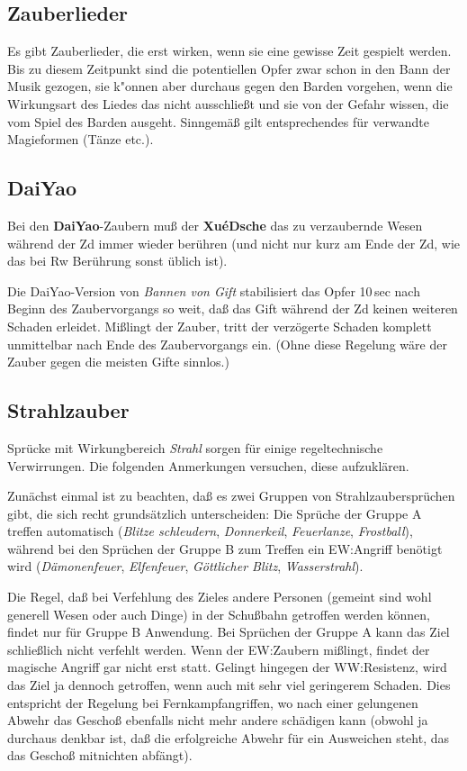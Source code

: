 \documentclass[10pt,a4paper,germanpar]{article}
\begin{document}
\subsection{Zauberlieder}

Es gibt Zauberlieder, die erst wirken, wenn sie eine gewisse Zeit
gespielt werden. Bis zu diesem Zeitpunkt sind die potentiellen Opfer
zwar schon in den Bann der Musik gezogen, sie k"onnen aber durchaus
gegen den Barden vorgehen, wenn die Wirkungsart des Liedes das nicht
ausschließt und sie von der Gefahr wissen, die vom Spiel des Barden
ausgeht. Sinngemäß gilt entsprechendes für verwandte Magieformen
(Tänze etc.).

\subsection{DaiYao}

Bei den \textbf{DaiYao}-Zaubern muß der \textbf{XuéDsche} das zu
verzaubernde Wesen während der Zd immer wieder berühren (und nicht nur
kurz am Ende der Zd, wie das bei Rw Berührung sonst üblich ist).

Die DaiYao-Version von \emph{Bannen von Gift} stabilisiert das Opfer
10\,sec nach Beginn des Zaubervorgangs so weit, daß das Gift während
der Zd keinen weiteren Schaden erleidet. Mißlingt der Zauber, tritt
der verzögerte Schaden komplett unmittelbar nach Ende des
Zaubervorgangs ein. (Ohne diese Regelung wäre der Zauber gegen die
meisten Gifte sinnlos.)

\subsection{Strahlzauber}
\label{strahlzauber}

Sprücke mit Wirkungbereich \emph{Strahl} sorgen für einige
regeltechnische Verwirrungen. Die folgenden Anmerkungen versuchen,
diese aufzuklären.

Zunächst einmal ist zu beachten, daß es zwei Gruppen von
Strahlzaubersprüchen gibt, die sich recht grundsätzlich unterscheiden:
Die Sprüche der Gruppe A treffen automatisch (\emph{Blitze
  schleudern}, \emph{Donnerkeil}, \emph{Feuerlanze},
\emph{Frostball}), während bei den Sprüchen der Gruppe B zum Treffen
ein EW:Angriff benötigt wird (\emph{Dämonenfeuer}, \emph{Elfenfeuer},
\emph{Göttlicher Blitz}, \emph{Wasserstrahl}).

Die Regel, daß bei Verfehlung des Zieles andere Personen (gemeint sind
wohl generell Wesen oder auch Dinge) in der Schußbahn getroffen werden
können, findet nur für Gruppe B Anwendung. Bei Sprüchen der Gruppe A
kann das Ziel schließlich nicht verfehlt werden. Wenn der EW:Zaubern
mißlingt, findet der magische Angriff gar nicht erst statt. Gelingt
hingegen der WW:Resistenz, wird das Ziel ja dennoch getroffen, wenn
auch mit sehr viel geringerem Schaden. Dies entspricht der Regelung
bei Fernkampfangriffen, wo nach einer gelungenen Abwehr das Geschoß
ebenfalls nicht mehr andere schädigen kann (obwohl ja durchaus denkbar
ist, daß die erfolgreiche Abwehr für ein Ausweichen steht, das das
Geschoß mitnichten abfängt).
\end{document}
